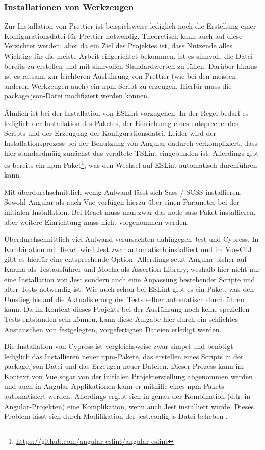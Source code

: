 \subsubsection{Installationen von Werkzeugen}
Zur Installation von Prettier ist beispielsweise lediglich noch die Erstellung einer Konfigurationsdatei für Prettier notwendig. Theoretisch kann auch auf diese Verzichtet werden, aber da ein Ziel des Projektes ist, dass Nutzende alles Wichtige für die meiste Arbeit eingerichtet bekommen, ist es sinnvoll, die Datei bereits zu erstellen und mit sinnvollen Standardwerten zu füllen. Darüber hinaus ist es ratsam, zur leichteren Ausführung von Prettier (wie bei den meisten anderen Werkzeugen auch) ein \gls{npm}-Script zu erzeugen. Hierfür muss die package.json-Datei modifiziert werden können.

Ähnlich ist bei der Installation von ESLint vorzugehen. In der Regel bedarf es lediglich der Installation des Paketes, der Einrichtung eines entsprechenden Scripts und der Erzeugung der Konfigurationsdatei. Leider wird der Installationsprozess bei der Benutzung von Angular dadurch verkompliziert, dass hier standardmäíg zunächst das veraltete TSLint eingebunden ist. Allerdings gibt es bereits ein \gls{npm}-Paket\footnote{\url{https://github.com/angular-eslint/angular-eslint}}, was den Wechsel auf ESLint automatisch durchführen kann.

Mit überdurchschnittlich wenig Aufwand lässt sich Sass / SCSS installieren. Sowohl Angular als auch Vue verfügen hierzu über einen Parameter bei der initialen Installation. Bei React muss man zwar das node-sass Paket installieren, aber weitere Einrichtung muss nicht vorgenommen werden.

Überdurchschnittlich viel Aufwand verursachten dahingegen Jest und Cypress. In Kombination mit React wird Jest zwar automatisch installiert und im Vue-\gls{CLI} gibt es hierfür eine entsprechende Option. Allerdings setzt Angular bisher auf Karma als Testausführer und Mocha als Assertion Library, weshalb hier nicht nur eine Installation von Jest sondern auch eine Anpassung bestehender Scripte und alter Tests notwendig ist. Wie auch schon bei ESLint gibt es ein Paket, was den Umstieg bis auf die Aktualisierung der Tests selber automatisch durchführen kann. Da im Kontext dieses Projekts bei der Ausführung noch keine speziellen Tests entstanden sein können, kann diese Aufgabe hier durch ein schlichtes Austauschen von festgelegten, vorgefertigten Dateien erledigt werden.

Die Installation von Cypress ist vergleichsweise zwar simpel und benötigt lediglich das Installieren neuer \gls{npm}-Pakete, das erstellen eines Scripts in der package.json-Datei und das Erzeugen neuer Dateien. Dieser Prozess kann im Kontext von Vue sogar von der initialen Projekterstellung abgenommen werden und auch in Angular-Applikationen kann er mithilfe eines \gls{npm}-Pakets automatisiert werden. Allerdings ergibt sich in genau der Kombination (d.h. in Angular-Projekten) eine Komplikation, wenn auch Jest installiert wurde. Dieses Problem lässt sich durch Modifikation der jest.config.js-Datei beheben \cite{angular_jest_cypress_issue}.

